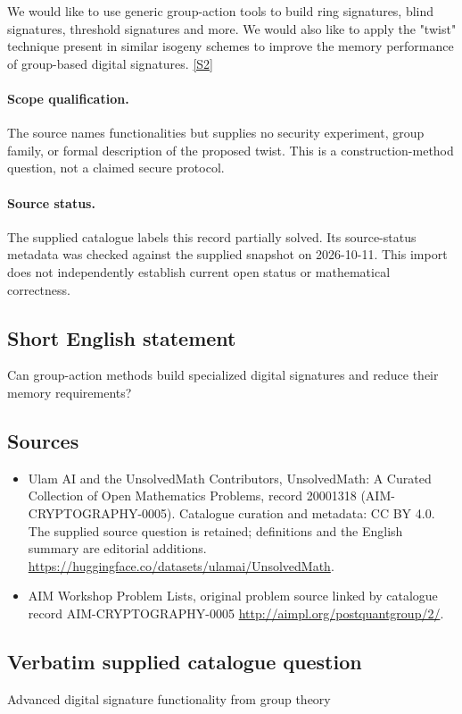 \documentclass[11pt]{article}
\begin{document}
We would like to use generic group-action tools to build ring signatures, blind signatures, threshold signatures and more. We would also like to apply the "twist" technique present in similar isogeny schemes to improve the memory performance of group-based digital signatures. \href{http://aimpl.org/postquantgroup/2/}{[S2]}
\paragraph{Scope qualification.}
The source names functionalities but supplies no security experiment, group family, or formal description of the proposed twist. This is a construction-method question, not a claimed secure protocol.
\paragraph{Source status.}
The supplied catalogue labels this record partially solved. Its source-status metadata was checked against the supplied snapshot on 2026-10-11. This import does not independently establish current open status or mathematical correctness.
\subsection{Short English statement}
Can group-action methods build specialized digital signatures and reduce their memory requirements?
\subsection{Sources}
\begin{itemize}
\item[S1] Ulam AI and the UnsolvedMath Contributors, UnsolvedMath: A Curated Collection of Open Mathematics Problems, record 20001318 (AIM-CRYPTOGRAPHY-0005). Catalogue curation and metadata: CC BY 4.0. The supplied source question is retained; definitions and the English summary are editorial additions.
\url{https://huggingface.co/datasets/ulamai/UnsolvedMath}.
\item[S2] AIM Workshop Problem Lists, original problem source linked by catalogue record AIM-CRYPTOGRAPHY-0005
\url{http://aimpl.org/postquantgroup/2/}.
\end{itemize}
\subsection{Verbatim supplied catalogue question}
Advanced digital signature functionality from group theory
\end{document}
